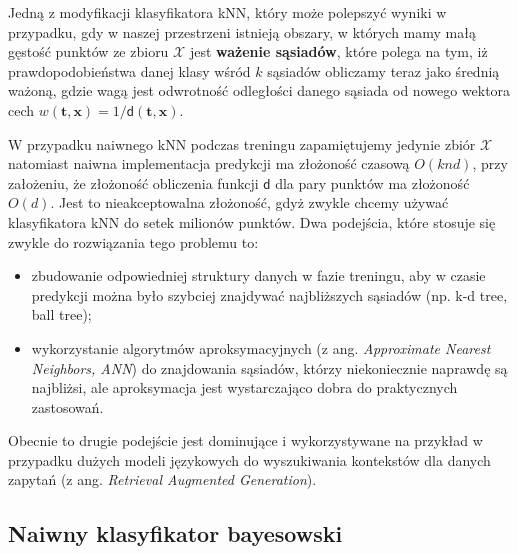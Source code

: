 \documentclass{myclass}
\numberwithin{equation}{section}
\begin{document}
Jedną z modyfikacji klasyfikatora kNN, który może polepszyć wyniki w przypadku, gdy w naszej
przestrzeni istnieją obszary, w których mamy małą gęstość punktów ze zbioru \(\mathcal{X}\) jest
\textbf{ważenie sąsiadów}, które polega na tym, iż prawdopodobieństwa danej klasy wśród \(k\)
sąsiadów obliczamy teraz jako średnią ważoną, gdzie wagą jest odwrotność odległości danego sąsiada
od nowego wektora cech \(w(\mathbf{t}, \mathbf{x}) = 1 / \mathsf{d}(\mathbf{t}, \mathbf{x})\).

W przypadku naiwnego kNN podczas treningu zapamiętujemy jedynie zbiór \(\mathcal{X}\) natomiast
naiwna implementacja predykcji ma złożoność czasową \(O(knd)\), przy założeniu, że złożoność
obliczenia funkcji \(\mathsf{d}\) dla pary punktów ma złożoność \(O(d)\). Jest to nieakceptowalna
złożoność, gdyż zwykle chcemy używać klasyfikatora kNN do setek milionów punktów. Dwa podejścia,
które stosuje się zwykle do rozwiązania tego problemu to: 
\begin{itemize}

    \item zbudowanie odpowiedniej struktury danych w fazie treningu, aby w czasie predykcji można
    było szybciej znajdywać najbliższych sąsiadów (np. k-d tree, ball tree);

    \item wykorzystanie algorytmów aproksymacyjnych (z ang. \textit{Approximate Nearest Neighbors,
    ANN}) do znajdowania sąsiadów, którzy niekoniecznie naprawdę są najbliżsi, ale aproksymacja jest
    wystarczająco dobra do praktycznych zastosowań.

\end{itemize}

Obecnie to drugie podejście jest dominujące i wykorzystywane na przykład w przypadku dużych modeli
językowych do wyszukiwania kontekstów dla danych zapytań (z ang. \textit{Retrieval Augmented
Generation}).


\subsection{Naiwny klasyfikator bayesowski}
\end{document}
